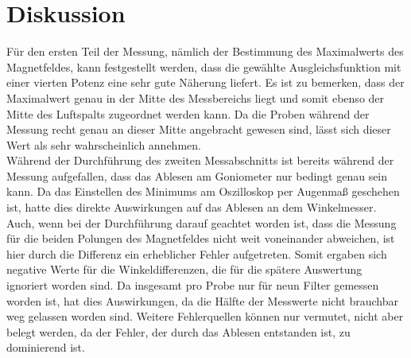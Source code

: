 \section{Diskussion}
Für den ersten Teil der Messung, nämlich der Bestimmung des Maximalwerts des Magnetfeldes, kann festgestellt werden, dass die gewählte Ausgleichsfunktion mit einer vierten Potenz eine sehr gute Näherung liefert. Es ist zu bemerken, dass der Maximalwert genau in der Mitte des Messbereichs liegt und somit ebenso der Mitte des Luftspalts zugeordnet werden kann.
Da die Proben während der Messung recht genau an dieser Mitte angebracht gewesen sind, lässt sich dieser Wert als sehr wahrscheinlich annehmen.\\
Während der Durchführung des zweiten Messabschnitts ist bereits während der Messung aufgefallen, dass das Ablesen am Goniometer nur bedingt genau sein kann. Da das Einstellen des Minimums am Oszilloskop per Augenmaß geschehen ist, hatte dies direkte Auswirkungen auf das Ablesen an dem Winkelmesser. Auch, wenn bei der Durchführung darauf geachtet worden ist, dass die Messung für die beiden Polungen des Magnetfeldes nicht weit voneinander abweichen, ist hier durch die Differenz ein erheblicher Fehler aufgetreten. Somit ergaben sich negative Werte für die Winkeldifferenzen, die für die spätere Auswertung ignoriert worden sind. Da insgesamt pro Probe nur für neun Filter gemessen worden ist, hat dies Auswirkungen, da die Hälfte der Messwerte nicht brauchbar weg gelassen worden sind. Weitere Fehlerquellen können nur vermutet, nicht aber belegt werden, da der Fehler, der durch das Ablesen entstanden ist, zu dominierend ist.
